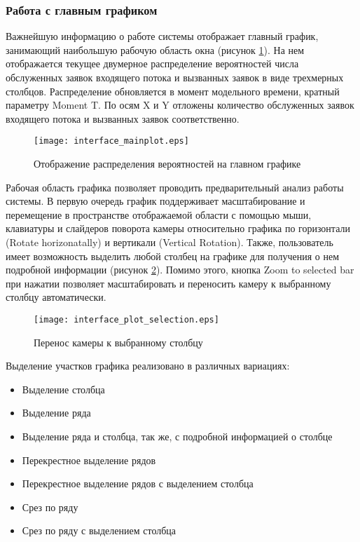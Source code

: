 \subsubsection{Работа с главным графиком}
Важнейшую информацию о работе системы отображает главный график, занимающий наибольшую рабочую область окна (рисунок \ref{interface_mainplot}). На нем отображается текущее двумерное распределение вероятностей числа обслуженных заявок входящего потока и вызванных заявок в виде трехмерных столбцов. Распределение обновляется в момент модельного времени, кратный параметру Moment T. По осям X и Y отложены количество обслуженных заявок входящего потока и вызванных заявок соответственно.
\begin{figure}[H]
	\centering
	\texttt{[image: interface\_mainplot.eps]}
	\caption{Отображение распределения вероятностей на главном графике}
	\label{interface_mainplot}
\end{figure}
Рабочая область графика позволяет проводить предварительный анализ работы системы. В первую очередь график поддерживает масштабирование и перемещение в пространстве отображаемой области с помощью мыши, клавиатуры и слайдеров поворота камеры относительно графика по горизонтали (Rotate horizonatally) и вертикали (Vertical Rotation).  Также, пользователь имеет возможность выделить любой столбец на графике для получения о нем подробной информации (рисунок \ref{interface_plot_selection}). Помимо этого, кнопка Zoom to selected bar при нажатии позволяет масштабировать и переносить камеру к выбранному столбцу автоматически.
\begin{figure}[H]
	\centering
	\texttt{[image: interface\_plot\_selection.eps]}
	\caption{Перенос камеры к выбранному столбцу}
	\label{interface_plot_selection}
\end{figure}
Выделение участков графика реализовано в различных вариациях:
\begin{itemize}
	\item Выделение столбца
	\item Выделение ряда
	\item Выделение ряда и столбца, так же, с подробной информацией о столбце
	\item Перекрестное выделение рядов
	\item Перекрестное выделение рядов с выделением столбца
	\item Срез по ряду
	\item Срез по ряду с выделением столбца
\end{itemize}

